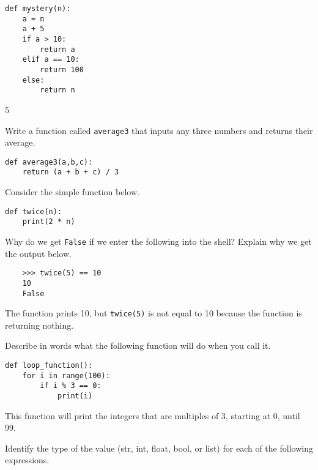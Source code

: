 \documentclass[12pt]{exam}
\begin{document}
\begin{questions}
\begin{lstlisting}
def mystery(n):
    a = n 
    a + 5
    if a > 10:
        return a
    elif a == 10:
        return 100
    else:
        return n
\end{lstlisting}
\begin{solution}
5
\end{solution}

\question Write a function called \lstinline{average3} that inputs any three numbers and returns their average.  
\begin{solution}
\begin{lstlisting}
def average3(a,b,c):
    return (a + b + c) / 3
\end{lstlisting}
\end{solution}
\vfill

\question Consider the simple function below.

\begin{lstlisting}
def twice(n):
    print(2 * n)
\end{lstlisting}

Why do we get \lstinline{False} if we enter the following into the shell? Explain why we get the output below. 

\begin{verbatim}
    >>> twice(5) == 10
    10
    False
\end{verbatim}

\begin{solution}
The function prints 10, but \lstinline{twice(5)} is not equal to 10 because the function is returning nothing.  
\end{solution}
\vfill

\question Describe in words what the following function will do when you call it.

\begin{lstlisting}
def loop_function():
    for i in range(100):
        if i % 3 == 0:
            print(i)
\end{lstlisting}

\begin{solution}
This function will print the integers that are multiples of 3, starting at 0, until 99. 
\end{solution}

\question Identify the type of the value (str, int, float, bool, or list) for each of the following expressions.
\end{questions}
\end{document}
